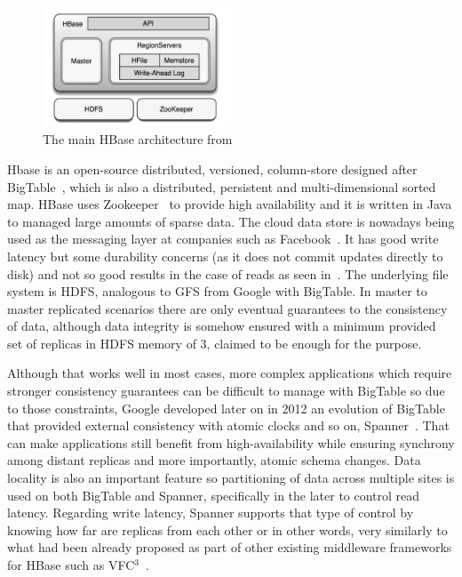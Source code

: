 
\begin{figure}[h]
\centering
\includegraphics[width=0.5\textwidth]{figs/hbase-main-architecture}
\caption{The main HBase architecture from \protect\cite{SlidesLars}}
\label{hbase-architecture}
\end{figure}

Hbase is an open-source distributed, versioned, column-store designed after BigTable~\cite{Chang:2006}, which is also a distributed, persistent and multi-dimensional sorted map. HBase uses Zookeeper~\cite{Hunt:2010} to provide high availability and it is written in Java to managed large amounts of sparse data. The cloud data store is nowadays being used as the messaging layer at companies such as Facebook~\cite{FacebookHBase}. It has good write latency but some durability concerns (as it does not commit updates directly to disk) and not so good results in the case of reads as seen in~\cite{YCSB:2010}. The underlying file system is HDFS, analogous to GFS from Google with BigTable. In master to master replicated scenarios there are only eventual guarantees to the consistency of data, although data integrity is somehow ensured with a minimum provided set of replicas in HDFS memory of 3, claimed to be enough for the purpose.

Although that works well in most cases, more complex applications which require stronger consistency guarantees can be difficult to manage with BigTable so due to those constraints, Google developed later on in 2012 an evolution of BigTable that provided external consistency with atomic clocks and so on, Spanner~\cite{Corbett:2012}. That can make applications still benefit from high-availability while ensuring synchrony among distant replicas and more importantly, atomic schema changes. Data locality is also an important feature so partitioning of data across multiple sites is used on both BigTable and Spanner, specifically in the later to control read latency. Regarding write latency, Spanner supports that type of control by knowing how far are replicas from each other or in other words, very similarly to what had been already proposed as part of other existing middleware frameworks for HBase such as VFC$^{3}$~\cite{Vfc3:2012}.


